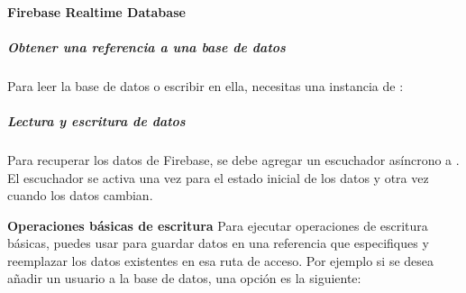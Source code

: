 %
\begin{sphinxVerbatim}[commandchars=\\\{\}]
   
     
    
\end{sphinxVerbatim}


\paragraph{Firebase Realtime Database}
\label{\detokenize{firebase_web:firebase-realtime-database}}

\subparagraph{Obtener una referencia a una base de datos}
\label{\detokenize{firebase_web:obtener-una-referencia-a-una-base-de-datos}}
Para leer la base de datos o escribir en ella, necesitas una instancia de
:

%
\begin{sphinxVerbatim}[commandchars=\\\{\}]
          
   
\end{sphinxVerbatim}


\subparagraph{Lectura y escritura de datos}
\label{\detokenize{firebase_web:lectura-y-escritura-de-datos}}
Para recuperar los datos de Firebase, se debe agregar un escuchador
asíncrono a . El escuchador se activa una vez para
el estado inicial de los datos y otra vez cuando los datos cambian.


\textbf{Operaciones básicas de escritura}
\label{\detokenize{firebase_web:operaciones-basicas-de-escritura}}
Para ejecutar operaciones de escritura básicas, puedes usar  para guardar
datos en una referencia que especifiques y reemplazar los datos existentes en
esa ruta de acceso. Por ejemplo si se desea añadir un usuario a la base de datos,
una opción es la siguiente:


